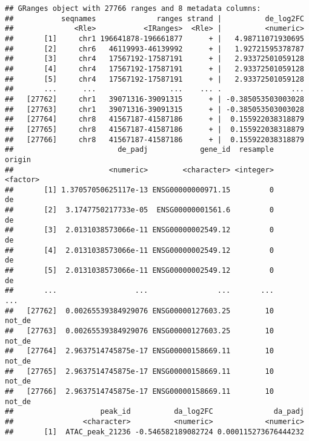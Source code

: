 \documentclass[
]{article}
\newenvironment{Shaded}{}{}
\newcommand{\KeywordTok}[1]{\textcolor[rgb]{0.00,0.44,0.13}{\textbf{#1}}}
\newcommand{\NormalTok}[1]{#1}
\newcommand{\OperatorTok}[1]{\textcolor[rgb]{0.40,0.40,0.40}{#1}}
\newcommand{\StringTok}[1]{\textcolor[rgb]{0.25,0.44,0.63}{#1}}
\begin{document}
\begin{Shaded}
\end{Shaded}

\begin{verbatim}
## GRanges object with 27766 ranges and 8 metadata columns:
##           seqnames              ranges strand |          de_log2FC
##              <Rle>           <IRanges>  <Rle> |          <numeric>
##       [1]     chr1 196641878-196661877      + |   4.98711071930695
##       [2]     chr6   46119993-46139992      + |   1.92721595378787
##       [3]     chr4   17567192-17587191      + |   2.93372501059128
##       [4]     chr4   17567192-17587191      + |   2.93372501059128
##       [5]     chr4   17567192-17587191      + |   2.93372501059128
##       ...      ...                 ...    ... .                ...
##   [27762]     chr1   39071316-39091315      + | -0.385053503003028
##   [27763]     chr1   39071316-39091315      + | -0.385053503003028
##   [27764]     chr8   41567187-41587186      + |  0.155922038318879
##   [27765]     chr8   41567187-41587186      + |  0.155922038318879
##   [27766]     chr8   41567187-41587186      + |  0.155922038318879
##                        de_padj            gene_id  resample   origin
##                      <numeric>        <character> <integer> <factor>
##       [1] 1.37057050625117e-13 ENSG00000000971.15         0       de
##       [2]  3.1747750217733e-05  ENSG00000001561.6         0       de
##       [3]  2.0131038573066e-11 ENSG00000002549.12         0       de
##       [4]  2.0131038573066e-11 ENSG00000002549.12         0       de
##       [5]  2.0131038573066e-11 ENSG00000002549.12         0       de
##       ...                  ...                ...       ...      ...
##   [27762]  0.00265539384929076 ENSG00000127603.25        10   not_de
##   [27763]  0.00265539384929076 ENSG00000127603.25        10   not_de
##   [27764]  2.9637514745875e-17 ENSG00000158669.11        10   not_de
##   [27765]  2.9637514745875e-17 ENSG00000158669.11        10   not_de
##   [27766]  2.9637514745875e-17 ENSG00000158669.11        10   not_de
##                    peak_id          da_log2FC              da_padj
##                <character>          <numeric>            <numeric>
##       [1]  ATAC_peak_21236 -0.546582189082724 0.000115273676444232

\end{verbatim}
\end{document}
